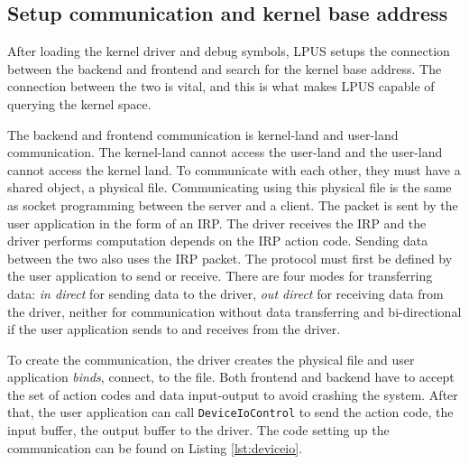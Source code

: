 \subsection[Setup communication and kernel base address]{Setup communication and kernel base address}

After loading the kernel driver and debug symbols, LPUS setups the connection
between the backend and frontend and search for the kernel base address. The
connection between the two is vital, and this is what makes LPUS capable of
querying the kernel space.

The backend and frontend communication is kernel-land and user-land
communication. The kernel-land cannot access the user-land and the user-land
cannot access the kernel land. To communicate with each other, they must have a
shared object, a physical file. Communicating using this physical file is the
same as socket programming between the server and a client. The packet is sent
by the user application in the form of an IRP. The driver receives the IRP and
the driver performs computation depends on the IRP action code.  Sending data
between the two also uses the IRP packet. The protocol must first be defined by
the user application to send or receive. There are four modes for transferring
data: \textit{in direct} for sending data to the driver, \textit{out direct}
for receiving data from the driver, neither for communication without data
transferring and bi-directional if the user application sends to and receives
from the driver.

To create the communication, the driver creates the physical file and user
application \textit{binds}, connect, to the file. Both frontend and backend
have to accept the set of action codes and data input-output to avoid crashing
the system. After that, the user application can call \texttt{DeviceIoControl}
to send the action code, the input buffer, the output buffer to the driver. The
code setting up the communication can be found on Listing \ref{lst:deviceio}.

